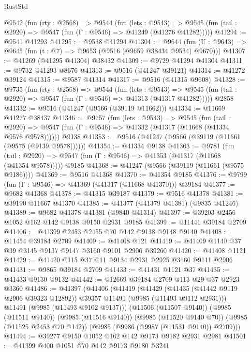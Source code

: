 \begin{lexlean}{RustStd}
\begin{coremodule}
  @9542
    (fun (rty : @2568) =>
    @9544
      (fun (lets : @9543) =>
      @9545 (fun (tail : @2920) => @9547 (fun (Γ : @9546) => @41249 (@41276 @41282)))))
@41294 := @9541 @41293
@41295 := @9538 @41294
@41304 := @9644
    (fun (U : @9643) => @9645 (fun (t : @7) => @9653 (@9516 (@9659 @38434 @9534) @9670)))
@41307 := @41269 (@41295 @41304) @38432
@41309 := @9729 @41294 @41304
@41311 := @9732 @41293 @8676
@41313 := @9516 (@41247 @39121)
@41314 := @41272 @39124
@41315 := @9587 @41314
@41317 := @9516 (@41315 @9608)
@41328 := @9735
    (fun (rty : @2568) =>
    @9544
      (fun (lets : @9543) =>
      @9545 (fun (tail : @2920) => @9547 (fun (Γ : @9546) => @41313 (@41317 @41282)))))
    @2858
@41332 := @9516 (@41247 (@9566 (@39119 @11662)))
@41334 := @11669 @41277 @38437
@41346 := @9757
    (fun (lets : @9543) =>
    @9545
      (fun (tail : @2920) =>
      @9547 (fun (Γ : @9546) => @41332 (@41317 (@11668 (@41334 @9576 @9578))))))
    @9138
@41353 := @9516 (@41247 (@9566 (@39119 (@11661 (@9575 (@9139 @9578))))))
@41354 := @41334 @9138
@41363 := @9781
    (fun (tail : @2920) => @9547 (fun (Γ : @9546) => @41353 (@41317 (@11668 (@41354 @9578)))))
    @9185
@41368 := @41247 (@9566 (@39119 (@11661 (@9575 @9186))))
@41369 := @9516 @41368
@41370 := @41354 @9185
@41376 := @9799 (fun (Γ : @9546) => @41369 (@41317 (@11668 @41370))) @39184
@41377 := @9682 @41368
@41378 := @41315 @39187
@41379 := @9516 @41378
@41381 := @39190 @11667 @41370
@41385 := @41377 (@41379 @41381) (@9835 @41246)
@41389 := @9682 @41378 @41381 (@9840 @41314)
@41397 := @39203 @2456 @1052 @162 @142 @9138 @9150 @2931 @9185
@41399 := @11441 @39184 @2709
@41406 := @41399 @2453 @2455 @70 @142 @9138 @9148 @9140
@41408 := @11454 @39184 @2709
@41409 := @41408 @121
@41419 := @41409 @1140 @37 @39 @3145 @9137 @9147 @3160 @9101 @2906 @39260
@41420 := @41408 @1121
@41429 := @41420 @115 @37 @11 @9134 @2931 @2925 @3160 @9111 @2906
@41431 := @9865 @39184 @2709
@41433 := @41431 @1121 @37
@41435 := @41433 @9130 @9132
@41442 := @12669 @39184 @2709 @113 @29 @37 @2923 @3360
@41486 := @41397
    (@41406
      (@41419
        (@41429
          (@41435 (@41442 @9119 @2906 @39323 @12892))
          @39357
          @11491
          (@9985 (@11493 @9112 @2931)))
        @11491
        (@9985 (@11493 @9102 @9137)))
      (@11506 (@11507 @9140))
      (@9985 (@11511 @9140))
      (@9985 (@11516 @9140))
      (@9985 (@11520 @9140 @70))
      (@9985 (@11525 @2453 @70 @142))
      (@9985 (@9986 (@9987 (@11531 @9140)) @2709)))
@41494 := @39277 @9150 @1052 @162 @142 @9173 @9182 @2931 @2981
@41501 := @41399 @400 @1051 @70 @142 @9173 @9180 @3241

\end{coremodule}
\end{lexlean}
